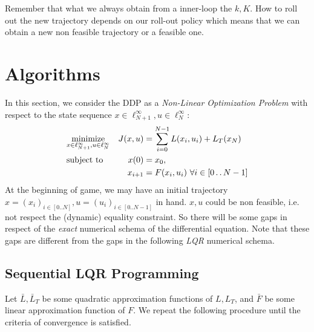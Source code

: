 \documentclass{report}
\newcommand{\twodots}{\mathinner {\ldotp \ldotp}}
\begin{document}
Remember that what we always obtain from a inner-loop the $k, K$. How to roll out the new trajectory depends on our roll-out policy which means that we can obtain a new non feasible trajectory or a feasible one.
\section{Algorithms}
In this section, we consider the DDP as a \emph{Non-Linear Optimization Problem} with respect to the state sequence $x \in \ell_{N+1}^\infty, u \in \ell_{N}^\infty$:
\begin{equation}
\begin{aligned}
&\underset{x \in \ell_{N+1}^\infty, u \in \ell_{N}^\infty}{\text{minimize}}          &J(x, u) &=\sum_{i = 0}^{N-1} L(x_i, u_i) + L_T(x_N) \\
&\text{subject to}       &x(0)      &= x_0,  \\ %
&							      &x_{i+1}  &= F(x_i, u_i)  
\ \forall i \in [0 \twodots N-1]
\end{aligned}
\end{equation}
At the beginning of game, we may have an initial trajectory $x =(x_i)_{i \in [0 .. N]}, u = (u_i)_{i \in [0 .. N-1]}$ in hand. $x,u$ could be non feasible, i.e. not respect the (dynamic) equality constraint. So there will be some gaps in respect of the \emph{exact} numerical schema of the differential equation. Note that these gaps are different from the gaps in the following \emph{LQR} numerical schema.
\subsection{Sequential LQR Programming}
Let $\bar{L}, \bar{L}_T$ be some quadratic approximation functions of $L, L_T$, and $\bar{F}$ be some linear approximation function of $F$. We repeat the following procedure until the criteria of convergence is satisfied.
\end{document}
